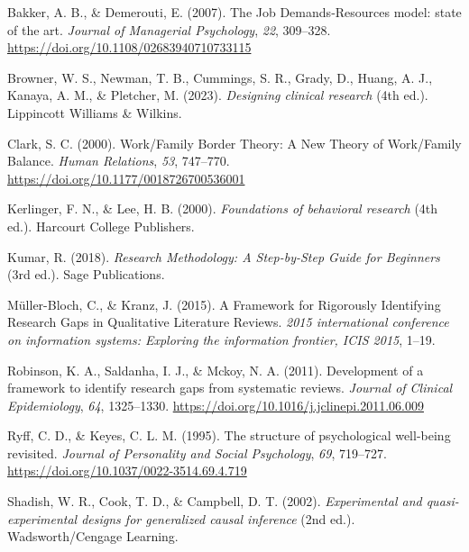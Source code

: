 \documentclass[
  indonesian,
  letterpaper,
  DIV=11,
  numbers=noendperiod]{scrreprt}
\newlength{\cslhangindent}
\newenvironment{CSLReferences}[2] %
 {\begin{list}{}{%
  \setlength{\itemindent}{0pt}
  \setlength{\leftmargin}{0pt}
  \setlength{\parsep}{0pt}
  \ifodd #1
   \setlength{\leftmargin}{\cslhangindent}
   \setlength{\itemindent}{-1\cslhangindent}
  \fi
  \setlength{\itemsep}{#2\baselineskip}}}
 {\end{list}}
\begin{document}

\label{refs--3}
\begin{CSLReferences}{1}{0}
Bakker, A. B., \& Demerouti, E. (2007). The Job Demands‐Resources model:
state of the art. \emph{Journal of Managerial Psychology}, \emph{22},
309--328. \url{https://doi.org/10.1108/02683940710733115}

Browner, W. S., Newman, T. B., Cummings, S. R., Grady, D., Huang, A. J.,
Kanaya, A. M., \& Pletcher, M. (2023). \emph{Designing clinical
research} (4th ed.). Lippincott Williams \& Wilkins.

Clark, S. C. (2000). Work/Family Border Theory: A New Theory of
Work/Family Balance. \emph{Human Relations}, \emph{53}, 747--770.
\url{https://doi.org/10.1177/0018726700536001}

Kerlinger, F. N., \& Lee, H. B. (2000). \emph{Foundations of behavioral
research} (4th ed.). Harcourt College Publishers.

Kumar, R. (2018). \emph{Research Methodology: A Step-by-Step Guide for
Beginners} (3rd ed.). Sage Publications.

Müller-Bloch, C., \& Kranz, J. (2015). A Framework for Rigorously
Identifying Research Gaps in Qualitative Literature Reviews. \emph{2015
international conference on information systems: Exploring the
information frontier, ICIS 2015}, 1--19.

Robinson, K. A., Saldanha, I. J., \& Mckoy, N. A. (2011). Development of
a framework to identify research gaps from systematic reviews.
\emph{Journal of Clinical Epidemiology}, \emph{64}, 1325--1330.
\url{https://doi.org/10.1016/j.jclinepi.2011.06.009}

Ryff, C. D., \& Keyes, C. L. M. (1995). The structure of psychological
well-being revisited. \emph{Journal of Personality and Social
Psychology}, \emph{69}, 719--727.
\url{https://doi.org/10.1037/0022-3514.69.4.719}

Shadish, W. R., Cook, T. D., \& Campbell, D. T. (2002).
\emph{Experimental and quasi-experimental designs for generalized causal
inference} (2nd ed.). Wadsworth/Cengage Learning.

\end{CSLReferences}
\end{document}
